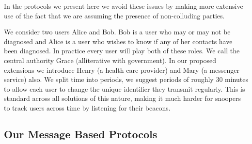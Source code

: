 \documentclass{article}
\begin{document}
In the protocols we present here we avoid these issues by making more extensive use of the fact that we are assuming the presence of non-colluding parties.
 
We consider two users Alice and Bob. Bob is a user who may or may not be diagnosed and Alice is a user who wishes to know if any of her contacts have been diagnosed. In practice every user will play both of these roles. We call the central authority Grace (alliterative with government). In our proposed extensions we introduce Henry (a health care provider) and Mary (a messenger service) also. We split time into periods, we suggest periods of roughly 30 minutes to allow each user to change the unique identifier they transmit regularly. This is standard across all solutions of this nature, making it much harder for snoopers to track users across time by listening for their beacons.
 
 
 

 
 \subsection{Our Message Based Protocols} \label{sec:message based protocols}
 
\end{document}
